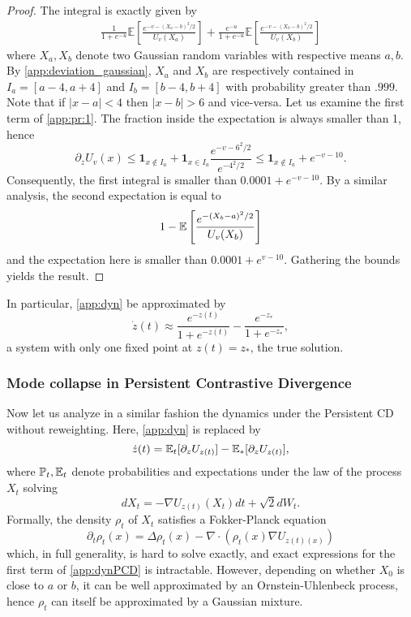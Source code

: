 \documentclass[a4paper,11pt]{extarticle}
\begin{document}
\begin{proof}
    The integral is exactly given by 
    \begin{align}\label{app:pr:1}
        \frac{1}{1+e^{-u}}\mathbb{E}\left[\frac{e^{-v-(X_a-b)^2 / 2}}{U_v(X_a)}\right] + \frac{e^{-u}}{1+e^{-u}}\mathbb{E}\left[\frac{e^{-v-(X_b-b)^2 / 2}}{U_v(X_b)}\right]
    \end{align}
    where $X_a, X_b$ denote two Gaussian random variables with respective means $a, b$. By \eqref{app:deviation_gaussian}, $X_a$ and $X_b$ are respectively contained in $I_a=[a-4, a+4]$ and $I_b=[b-4, b+4]$ with probability greater than $.999$. Note that if $|x-a|<4$ then $|x-b|>6$ and vice-versa. Let us examine the first term of \eqref{app:pr:1}. The fraction inside the expectation is always smaller than 1, hence 
    $$\partial_z U_v(x) \leqslant \mathbf{1}_{x\notin I_a} + \mathbf{1}_{x\in I_a}\frac{e^{-v - 6^2/2}}{e^{-4^2/2}} \leqslant \mathbf{1}_{x \notin I_a} + e^{-v - 10}. $$
    Consequently, the first integral is smaller than $0.0001 + e^{-v-10}$. By a similar analysis, the second expectation is equal to 
    $$ 1 - \mathbb{E}\left[\frac{e^{-(X_b-a)^2/ 2}}{U_v(X_b)} \right]$$
    and the expectation here is smaller than $ 0.0001 + e^{v - 10}$. Gathering the bounds yields the result. 
\end{proof}

In particular, \eqref{app:dyn} be approximated by 
\begin{equation}
    \dot{z}(t) \approx \frac{e^{-z(t)}}{1 + e^{-z(t)}} - \frac{e^{-z_*}}{1 + e^{-z_*}}, 
\end{equation}
a system with only one fixed point at $z(t)=z_*$, the true solution. 

\subsubsection*{Mode collapse in Persistent Contrastive Divergence}
Now let us analyze in a similar fashion the dynamics under the Persistent CD without reweighting. Here, \eqref{app:dyn} is replaced by 
\begin{equation}\label{app:dynPCD} \dot{z}(t) = \mathbb{E}_{t}[\partial_z U_{z(t)}] - \mathbb{E}_*[\partial_z U_{z(t)}], \end{equation}
where $\mathbb{P}_t, \mathbb{E}_t$ denote probabilities and expectations under the law of the process $X_t$ solving 
$$dX_t = -\nabla U_{z(t)}(X_t)dt + \sqrt{2}dW_t.$$ Formally, the density $\rho_t$ of $X_t$ satisfies a Fokker-Planck equation 
$$ \partial_t \rho_t(x) = \Delta \rho_t(x) - \nabla\cdot(\rho_t(x)\nabla U_{z(t)(x)})$$
which, in full generality, is hard to solve exactly, and exact expressions for the first term of \eqref{app:dynPCD} is intractable. However, depending on whether $X_0$ is close to $a$ or $b$, it can be well approximated by an Ornstein-Uhlenbeck process, hence $\rho_t$ can itself be approximated by a Gaussian mixture. 
\end{document}
